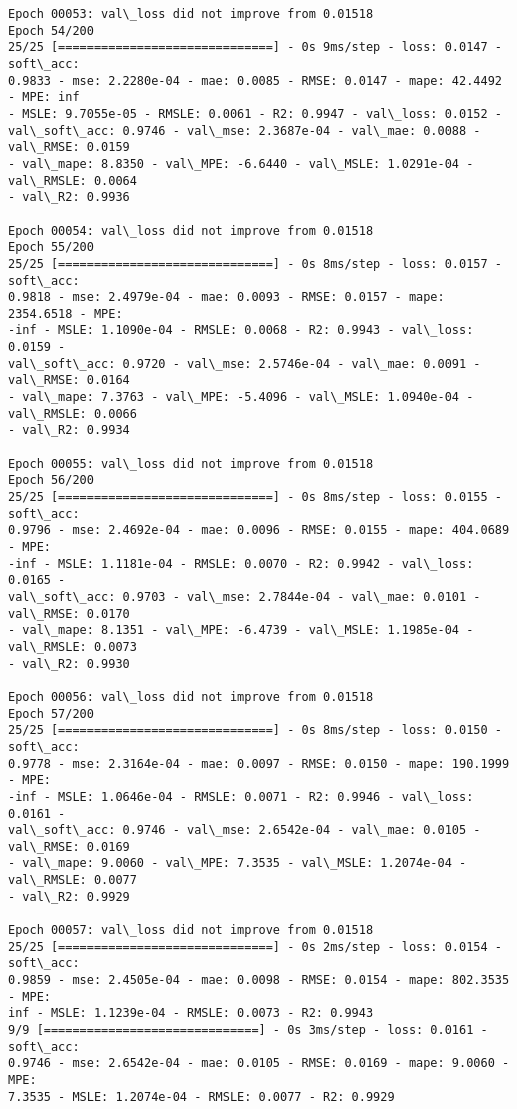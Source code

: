 \documentclass[11pt]{article}
\begin{document}
\begin{Verbatim}[commandchars=\\\{\}]
Epoch 00053: val\_loss did not improve from 0.01518
Epoch 54/200
25/25 [==============================] - 0s 9ms/step - loss: 0.0147 - soft\_acc:
0.9833 - mse: 2.2280e-04 - mae: 0.0085 - RMSE: 0.0147 - mape: 42.4492 - MPE: inf
- MSLE: 9.7055e-05 - RMSLE: 0.0061 - R2: 0.9947 - val\_loss: 0.0152 -
val\_soft\_acc: 0.9746 - val\_mse: 2.3687e-04 - val\_mae: 0.0088 - val\_RMSE: 0.0159
- val\_mape: 8.8350 - val\_MPE: -6.6440 - val\_MSLE: 1.0291e-04 - val\_RMSLE: 0.0064
- val\_R2: 0.9936

Epoch 00054: val\_loss did not improve from 0.01518
Epoch 55/200
25/25 [==============================] - 0s 8ms/step - loss: 0.0157 - soft\_acc:
0.9818 - mse: 2.4979e-04 - mae: 0.0093 - RMSE: 0.0157 - mape: 2354.6518 - MPE:
-inf - MSLE: 1.1090e-04 - RMSLE: 0.0068 - R2: 0.9943 - val\_loss: 0.0159 -
val\_soft\_acc: 0.9720 - val\_mse: 2.5746e-04 - val\_mae: 0.0091 - val\_RMSE: 0.0164
- val\_mape: 7.3763 - val\_MPE: -5.4096 - val\_MSLE: 1.0940e-04 - val\_RMSLE: 0.0066
- val\_R2: 0.9934

Epoch 00055: val\_loss did not improve from 0.01518
Epoch 56/200
25/25 [==============================] - 0s 8ms/step - loss: 0.0155 - soft\_acc:
0.9796 - mse: 2.4692e-04 - mae: 0.0096 - RMSE: 0.0155 - mape: 404.0689 - MPE:
-inf - MSLE: 1.1181e-04 - RMSLE: 0.0070 - R2: 0.9942 - val\_loss: 0.0165 -
val\_soft\_acc: 0.9703 - val\_mse: 2.7844e-04 - val\_mae: 0.0101 - val\_RMSE: 0.0170
- val\_mape: 8.1351 - val\_MPE: -6.4739 - val\_MSLE: 1.1985e-04 - val\_RMSLE: 0.0073
- val\_R2: 0.9930

Epoch 00056: val\_loss did not improve from 0.01518
Epoch 57/200
25/25 [==============================] - 0s 8ms/step - loss: 0.0150 - soft\_acc:
0.9778 - mse: 2.3164e-04 - mae: 0.0097 - RMSE: 0.0150 - mape: 190.1999 - MPE:
-inf - MSLE: 1.0646e-04 - RMSLE: 0.0071 - R2: 0.9946 - val\_loss: 0.0161 -
val\_soft\_acc: 0.9746 - val\_mse: 2.6542e-04 - val\_mae: 0.0105 - val\_RMSE: 0.0169
- val\_mape: 9.0060 - val\_MPE: 7.3535 - val\_MSLE: 1.2074e-04 - val\_RMSLE: 0.0077
- val\_R2: 0.9929

Epoch 00057: val\_loss did not improve from 0.01518
25/25 [==============================] - 0s 2ms/step - loss: 0.0154 - soft\_acc:
0.9859 - mse: 2.4505e-04 - mae: 0.0098 - RMSE: 0.0154 - mape: 802.3535 - MPE:
inf - MSLE: 1.1239e-04 - RMSLE: 0.0073 - R2: 0.9943
9/9 [==============================] - 0s 3ms/step - loss: 0.0161 - soft\_acc:
0.9746 - mse: 2.6542e-04 - mae: 0.0105 - RMSE: 0.0169 - mape: 9.0060 - MPE:
7.3535 - MSLE: 1.2074e-04 - RMSLE: 0.0077 - R2: 0.9929
    \end{Verbatim}
\end{document}
